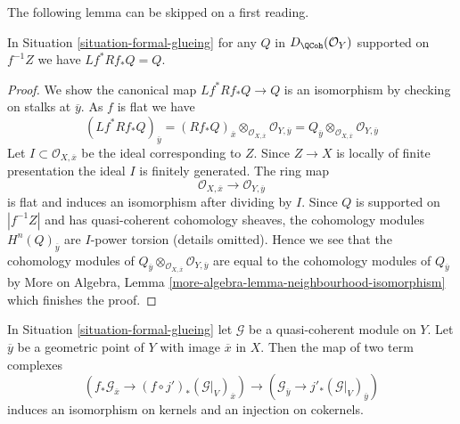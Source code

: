 \noindent
The following lemma can be skipped on a first reading.

\begin{lemma}
\label{lemma-formal-glueing-on-closed}
In Situation \ref{situation-formal-glueing} for any $Q$
in $D_\QCoh(\mathcal{O}_Y)$ supported on $f^{-1}Z$ we have
$Lf^*Rf_*Q = Q$.
\end{lemma}

\begin{proof}
We show the canonical map $Lf^*Rf_*Q \to Q$ is an isomorphism
by checking on stalks at $\overline{y}$. As $f$ is flat we have
$$
(Lf^*Rf_*Q)_{\overline{y}} =
(Rf_*Q)_{\overline{x}}
\otimes_{\mathcal{O}_{X, \overline{x}}}
\mathcal{O}_{Y, \overline{y}} =
Q_{\overline{y}} \otimes_{\mathcal{O}_{X, \overline{x}}}
\mathcal{O}_{Y, \overline{y}}
$$
Let $I \subset \mathcal{O}_{X, \overline{x}}$ be the ideal
corresponding to $Z$. Since $Z \to X$ is locally of finite presentation
the ideal $I$ is finitely generated. The ring map
$$
\mathcal{O}_{X, \overline{x}} \to \mathcal{O}_{Y, \overline{y}}
$$
is flat and induces an isomorphism after dividing by $I$. Since $Q$ is
supported on $|f^{-1}Z|$ and has quasi-coherent cohomology sheaves,
the cohomology modules $H^n(Q)_{\overline{y}}$
are $I$-power torsion (details omitted). Hence we see that
the cohomology modules of
$Q_{\overline{y}} \otimes_{\mathcal{O}_{X, \overline{x}}}
\mathcal{O}_{Y, \overline{y}}$
are equal to the cohomology modules of $Q_{\overline{y}}$ by
More on Algebra, Lemma \ref{more-algebra-lemma-neighbourhood-isomorphism}
which finishes the proof.
\end{proof}

\begin{lemma}
\label{lemma-stalk-formal-glueing}
In Situation \ref{situation-formal-glueing} let $\mathcal{G}$
be a quasi-coherent module on $Y$. Let $\overline{y}$ be a
geometric point of $Y$ with image $\overline{x}$ in $X$.
Then the map of two term complexes
$$
\left(f_*\mathcal{G}_{\overline{x}} \to
(f \circ j')_*(\mathcal{G}|_V)_{\overline{x}}\right)
\longrightarrow
\left(\mathcal{G}_{\overline{y}} \to j'_*(\mathcal{G}|_V)_{\overline{y}}\right)
$$
induces an isomorphism on kernels and an injection on cokernels.
\end{lemma}

